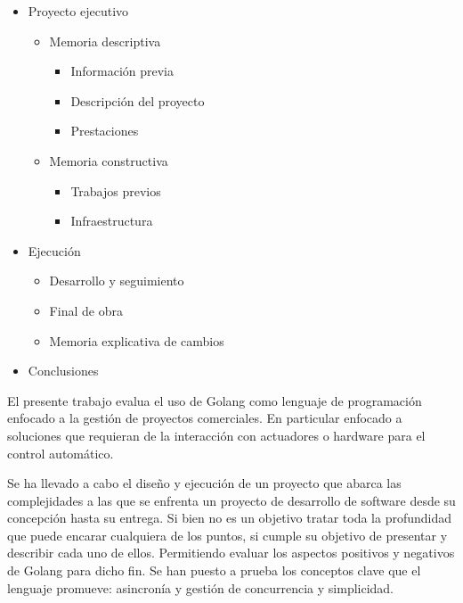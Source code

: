 \begin{itemize}
    \item Proyecto ejecutivo
    \begin{itemize}
        \item Memoria descriptiva
        \begin{itemize}
            \item Información previa
            \item Descripción del proyecto
            \item Prestaciones
        \end{itemize}
    \end{itemize}
    \begin{itemize}
              \item Memoria constructiva
              \begin{itemize}
                  \item Trabajos previos
                  \item Infraestructura
              \end{itemize}
    \end{itemize}
    \item Ejecución
    \begin{itemize}
        \item Desarrollo y seguimiento
        \item Final de obra
        \item Memoria explicativa de cambios
    \end{itemize}
    \item Conclusiones
\end{itemize}

El presente trabajo evalua el uso de Golang como lenguaje de programación enfocado a la gestión de proyectos comerciales. En particular enfocado a soluciones que requieran de la interacción con actuadores o hardware para el control automático.

Se ha llevado a cabo el diseño y ejecución de un proyecto que abarca las complejidades a las que se enfrenta un proyecto de desarrollo de software desde su concepción hasta su entrega. Si bien no es un objetivo tratar toda la profundidad que puede encarar cualquiera de los puntos, si cumple su objetivo de presentar y describir cada uno de ellos. Permitiendo evaluar los aspectos positivos y negativos de Golang para dicho fin. Se han puesto a prueba los conceptos clave que el lenguaje promueve: asincronía y gestión de concurrencia y simplicidad.

